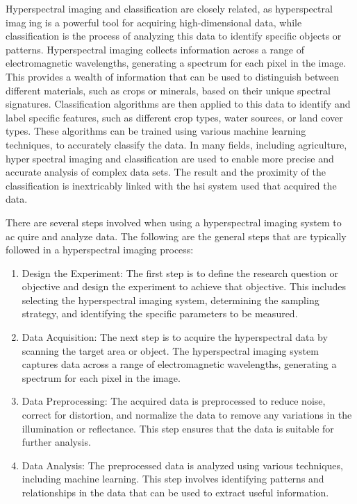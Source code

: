 \documentclass{article}
\begin{document}
{                Hyperspectral imaging and classification are closely related, as hyperspectral imaging is a powerful tool for acquiring high-dimensional data, while classification is the process of analyzing this data to identify specific objects or patterns. Hyperspectral imaging collects information across a range of electromagnetic wavelengths, generating a spectrum for each pixel in the image. This provides a wealth of information that can be used to distinguish between different materials, such as crops or minerals, based on their unique spectral signatures. Classification algorithms are then applied to this data to identify and label specific features, such as different crop types, water sources, or land cover types. These algorithms can be trained using various machine learning techniques, to accurately classify the data. In many fields, including agriculture, hyperspectral imaging and classification are used to enable more precise and accurate analysis of complex data sets. The result and the proximity of the classification is inextricably linked with the hsi system used that acquired the data.\par
                There are several steps involved when using a hyperspectral imaging system to acquire and analyze data. The following are the general steps that are typically followed in a hyperspectral imaging process:\par
                 \begin{enumerate}
                 \item Design the Experiment: The first step is to define the research question or objective and design the experiment to achieve that objective. This includes selecting the hyperspectral imaging system, determining the sampling strategy, and identifying the specific parameters to be measured.
                 \item Data Acquisition: The next step is to acquire the hyperspectral data by scanning the target area or object. The hyperspectral imaging system captures data across a range of electromagnetic wavelengths, generating a spectrum for each pixel in the image.
                 \item Data Preprocessing: The acquired data is preprocessed to reduce noise, correct for distortion, and normalize the data to remove any variations in the illumination or reflectance. This step ensures that the data is suitable for further analysis.
                 \item Data Analysis: The preprocessed data is analyzed using various techniques, including machine learning. This step involves identifying patterns and relationships in the data that can be used to extract useful information.

\end{enumerate}}
\end{document}
